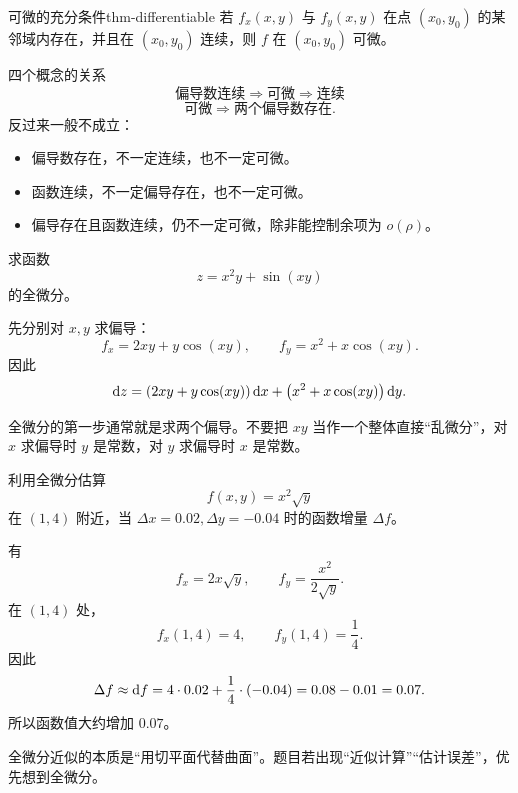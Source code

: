 \begin{dl}{可微的充分条件}{thm-differentiable}
若 $f_x(x,y)$ 与 $f_y(x,y)$ 在点 $(x_0,y_0)$ 的某邻域内存在，并且在 $(x_0,y_0)$ 连续，则 $f$ 在 $(x_0,y_0)$ 可微。
\end{dl}

\begin{methodbox}{四个概念的关系}
\[
\text{偏导数连续}\Longrightarrow \text{可微}
\Longrightarrow \text{连续}
\]
\[
\text{可微}\Longrightarrow \text{两个偏导数存在}.
\]
反过来一般不成立：
\begin{itemize}
  \item 偏导数存在，不一定连续，也不一定可微。
  \item 函数连续，不一定偏导存在，也不一定可微。
  \item 偏导存在且函数连续，仍不一定可微，除非能控制余项为 $o(\rho)$。
\end{itemize}
\end{methodbox}

\begin{problem}
求函数
\[
  z=x^2y+\sin(xy)
\]
的全微分。
\end{problem}
\begin{solution}
先分别对 $x,y$ 求偏导：
\[
  f_x=2xy+y\cos(xy),\qquad
  f_y=x^2+x\cos(xy).
\]
因此
\[
  \mathop{}\!\mathrm{d} z=\left(2xy+y\cos(xy)\right)\mathop{}\!\mathrm{d} x+
  \left(x^2+x\cos(xy)\right)\mathop{}\!\mathrm{d} y.
\]
\end{solution}
\begin{note}
全微分的第一步通常就是求两个偏导。不要把 $xy$ 当作一个整体直接“乱微分”，对 $x$ 求偏导时 $y$ 是常数，对 $y$ 求偏导时 $x$ 是常数。
\end{note}

\begin{problem}
利用全微分估算
\[
  f(x,y)=x^2\sqrt{y}
\]
在 $(1,4)$ 附近，当 $\Delta x=0.02,\Delta y=-0.04$ 时的函数增量 $\Delta f$。
\end{problem}
\begin{solution}
有
\[
  f_x=2x\sqrt{y},\qquad f_y=\frac{x^2}{2\sqrt y}.
\]
在 $(1,4)$ 处，
\[
  f_x(1,4)=4,\qquad f_y(1,4)=\frac14.
\]
因此
\[
  \Delta f\approx \mathop{}\!\mathrm{d} f=4\cdot 0.02+\frac14\cdot(-0.04)=0.08-0.01=0.07.
\]
所以函数值大约增加 $0.07$。
\end{solution}
\begin{note}
全微分近似的本质是“用切平面代替曲面”。题目若出现“近似计算”“估计误差”，优先想到全微分。
\end{note}

